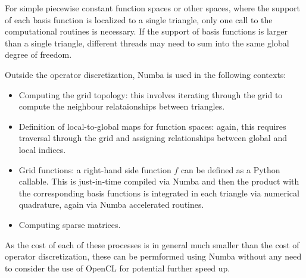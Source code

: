 For simple piecewise constant function spaces or other spaces, where the support of each basis function is localized to a single triangle, only one call to the computational routines is necessary. If the support of basis functions is larger than a single triangle, different threads may need to sum into the same global degree of freedom.

Outside the operator discretization, Numba is used in the following contexts:
\begin{itemize}
  \item Computing the grid topology: this involves iterating through the grid to compute the neighbour relataionships between triangles.
  \item Definition of local-to-global maps for function spaces: again, this requires traversal through the grid and assigning relationships between global and local indices.
  \item Grid functions: a right-hand side function $f$ can be defined as a Python callable. This is just-in-time compiled via Numba and then the product with the corresponding basis functions is integrated in each triangle via numerical quadrature, again via Numba accelerated routines.
  \item Computing sparse matrices.
\end{itemize}

As the cost of each of these processes is in general much smaller than the cost of operator discretization, these can be permformed using Numba without any need to consider the use of OpenCL for potential further speed up.
